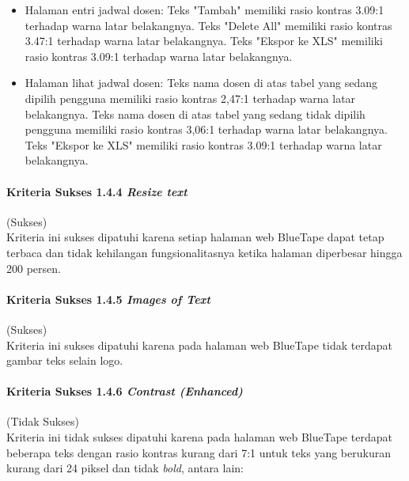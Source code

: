 \begin{itemize}
    \item Halaman entri jadwal dosen: Teks "Tambah" memiliki rasio kontras 3.09:1 terhadap warna latar belakangnya. Teks "Delete All" memiliki rasio kontras 3.47:1 terhadap warna latar belakangnya. Teks "Ekspor ke XLS" memiliki rasio kontras 3.09:1 terhadap warna latar belakangnya.
    \item Halaman lihat jadwal dosen: Teks nama dosen di atas tabel yang sedang dipilih pengguna memiliki rasio kontras 2,47:1 terhadap warna latar belakangnya. Teks nama dosen di atas tabel yang sedang tidak dipilih pengguna memiliki rasio kontras 3,06:1 terhadap warna latar belakangnya. Teks "Ekspor ke XLS" memiliki rasio kontras 3.09:1 terhadap warna latar belakangnya.
\end{itemize}

\paragraph{Kriteria Sukses 1.4.4 \textit{Resize text}}
\label{par:kepatuhan_bluetape_kriteria_sukses_1.4.4}
(Sukses)\\

Kriteria ini sukses dipatuhi karena setiap halaman web BlueTape dapat tetap terbaca dan tidak kehilangan fungsionalitasnya ketika halaman diperbesar hingga 200 persen. 

\paragraph{Kriteria Sukses 1.4.5 \textit{Images of Text}}
\label{par:kepatuhan_bluetape_kriteria_sukses_1.4.5}
(Sukses)\\

Kriteria ini sukses dipatuhi karena pada halaman web BlueTape tidak terdapat gambar teks selain logo.

\paragraph{Kriteria Sukses 1.4.6 \textit{Contrast (Enhanced)}}
\label{par:kepatuhan_bluetape_kriteria_sukses_1.4.2}
(Tidak Sukses)\\

Kriteria ini tidak sukses dipatuhi karena pada halaman web BlueTape terdapat beberapa teks dengan rasio kontras kurang dari 7:1 untuk teks yang berukuran kurang dari 24 piksel dan tidak \textit{bold}, antara lain:


